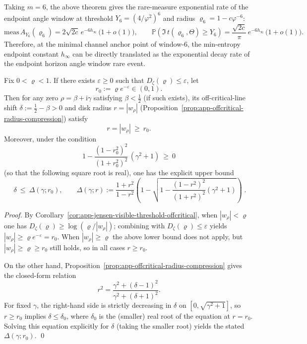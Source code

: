 \begin{remark}\label{rem:app-endpoint-window-window6}
Taking \(m=6\), the above theorem gives the rare-measure exponential rate of the endpoint angle window at threshold \(Y_6=(4/\varphi^2)^6\) and radius \(\varrho_6=1-c\varphi^{-6}\):
\[
\mathrm{meas}\,A_{Y_6}(\varrho_6)
=2\sqrt{2c}\,e^{-6h_\infty}\,\bigl(1+o(1)\bigr),
\qquad
\mathbb{P}\!\left(\Im\,t(\varrho_6,\Theta)\ge Y_6\right)
=\frac{\sqrt{2c}}{\pi}\,e^{-6h_\infty}\,\bigl(1+o(1)\bigr).
\]
Therefore, at the minimal channel anchor point of window-\(6\), the min-entropy endpoint constant \(h_\infty\) can be directly translated as the exponential decay rate of the endpoint horizon angle window rare event.
\end{remark}

\begin{theorem}\label{thm:app-jensen-defect-controls-offcritical-shift}
Fix \(0<\varrho<1\).
If there exists \(\varepsilon\ge 0\) such that \(D_{\zeta}(\varrho)\le \varepsilon\), let
\[
r_0:=\varrho e^{-\varepsilon}\in(0,1).
\]
Then for any zero \(\rho=\beta+\mathrm{i}\gamma\) satisfying \(\beta<\tfrac12\) (if such exists), its off-critical-line shift \(\delta:=\tfrac12-\beta>0\) and disk radius \(r=|w_{\rho}|\) (Proposition~\ref{prop:app-offcritical-radius-compression}) satisfy
\[
r=|w_{\rho}|\ \ge\ r_0.
\]
Moreover, under the condition
\[
1-\frac{(1-r_0^2)^2}{(1+r_0^2)^2}\,(\gamma^2+1)\ \ge\ 0
\]
(so that the following square root is real), one has the explicit upper bound
\[
\boxed{\;
\delta\ \le\ \Delta(\gamma;r_0),\qquad
\Delta(\gamma;r)
:=\frac{1+r^{2}}{1-r^{2}}
\left(1-\sqrt{1-\frac{(1-r^{2})^{2}}{(1+r^{2})^{2}}(\gamma^{2}+1)}\right)\; }.
\]
\end{theorem}

\begin{proof}
By Corollary~\ref{cor:app-jensen-visible-threshold-offcritical}, when \(|w_{\rho}|<\varrho\) one has
\(
D_{\zeta}(\varrho)\ge \log(\varrho/|w_{\rho}|)
\);
combining with \(D_{\zeta}(\varrho)\le \varepsilon\) yields \(|w_{\rho}|\ge \varrho e^{-\varepsilon}=r_0\).
When \(|w_{\rho}|\ge \varrho\) the above lower bound does not apply, but \(|w_{\rho}|\ge \varrho\ge r_0\) still holds, so in all cases \(r\ge r_0\).
\par
On the other hand, Proposition~\ref{prop:app-offcritical-radius-compression} gives the closed-form relation
\[
r^{2}=\frac{\gamma^{2}+(\delta-1)^{2}}{\gamma^{2}+(\delta+1)^{2}}.
\]
For fixed \(\gamma\), the right-hand side is strictly decreasing in \(\delta\) on \([0,\sqrt{\gamma^{2}+1}]\), so \(r\ge r_0\) implies \(\delta\le \delta_0\), where \(\delta_0\) is the (smaller) real root of the equation at \(r=r_0\).
Solving this equation explicitly for \(\delta\) (taking the smaller root) yields the stated \(\Delta(\gamma;r_0)\). \qed
\end{proof}

